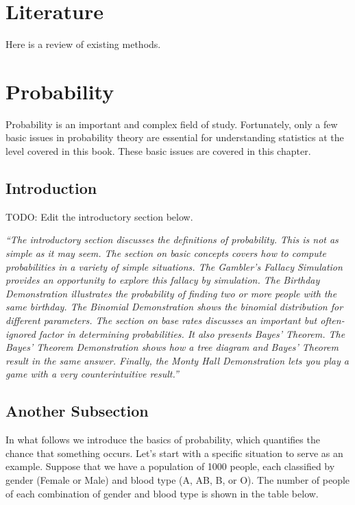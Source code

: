 \documentclass[
]{book}
\begin{document}
\hypertarget{literature}{%
\chapter{Literature}\label{literature}}

Here is a review of existing methods.

\hypertarget{probability}{%
\chapter{Probability}\label{probability}}

Probability is an important and complex field of study. Fortunately, only a few basic issues in probability theory are essential for understanding statistics at the level covered in this book. These basic issues are covered in this chapter.

\hypertarget{introduction}{%
\section{Introduction}\label{introduction}}

TODO: Edit the introductory section below.

\emph{``The introductory section discusses the definitions of probability. This is not as simple as it may seem. The section on basic concepts covers how to compute probabilities in a variety of simple situations. The Gambler's Fallacy Simulation provides an opportunity to explore this fallacy by simulation. The Birthday Demonstration illustrates the probability of finding two or more people with the same birthday. The Binomial Demonstration shows the binomial distribution for different parameters. The section on base rates discusses an important but often-ignored factor in determining probabilities. It also presents Bayes' Theorem. The Bayes' Theorem Demonstration shows how a tree diagram and Bayes' Theorem result in the same answer. Finally, the Monty Hall Demonstration lets you play a game with a very counterintuitive result.''}

\hypertarget{another-subsection}{%
\section{Another Subsection}\label{another-subsection}}

In what follows we introduce the basics of probability, which quantifies the
chance that something occurs. Let's start with a specific situation to serve
as an example. Suppose that we have a population of 1000 people, each classified
by gender (Female or Male) and blood type (A, AB, B, or O). The number of
people of each combination of gender and blood type is
shown in the table below.
\end{document}
